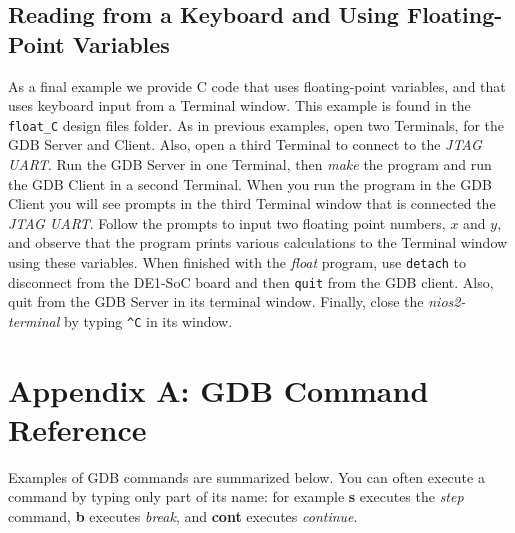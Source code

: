 \documentclass[11pt, twoside, pdftex]{article}
\begin{document}
\subsection{Reading from a Keyboard and Using Floating-Point Variables}

As a final example we provide C code that uses floating-point variables, and that uses
keyboard input from a Terminal window. This example is found in the \texttt{float\_C} design 
files folder. As in previous examples, open two Terminals, for the GDB Server and Client.
Also, open a third Terminal to connect to the {\it JTAG UART}. Run the GDB Server in one
Terminal, then {\it make} the program and run the GDB Client in a second Terminal. When
you run the program in the GDB Client you will see prompts in the third Terminal window
that is connected the {\it JTAG UART}. Follow the prompts to input two floating point
numbers, $x$ and $y$, and observe that the program prints various calculations to the
Terminal window using these variables. 
When finished with the {\it float} program, use \texttt{detach} to disconnect from the 
DE1-SoC board and then \texttt{quit} from the GDB client. Also, quit from the GDB Server in 
its terminal window. Finally, close the {\it nios2-terminal} by 
typing \texttt{\textasciicircum C} in its window.

\newpage
\section*{Appendix A: GDB Command Reference}

Examples of GDB commands are summarized below. You can often execute a command by typing
only part of its name: for example {\bf s} executes the {\it step} command, {\bf b} executes
{\it break}, and {\bf cont} executes {\it continue}.
\end{document}
